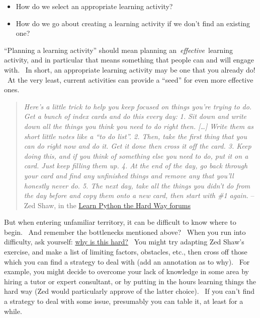 \begin{itemize}
\item
  How do we select an appropriate learning activity?
\item
  How do we go about creating a learning activity if we don't find an
  existing one?
\end{itemize}

``Planning a learning activity'' should mean planning
an~\emph{effective}~learning activity, and in particular that means
something that people can and will engage with. ~In short, an
appropriate learning activity may be one that you already do! ~At the
very least, current activities can provide a ``seed'' for even more
effective ones.

\begin{quote}
\emph{Here's a little trick to help you keep focused on things you're
trying to do. Get a bunch of index cards and do this every day:}
\emph{1. Sit down and write down all the things you think you need to do
right then. {[}\ldots{}{]} Write them as short little notes like a ``to
do list''. 2. Then, take the first thing that you can do right now and
do it. Get it done then cross it off the card. 3. Keep doing this, and
if you think of something else you need to do, put it on a card. Just
keep filling them up. 4. At the end of the day, go back through your
card and find any unfinished things and remove any that you'll honestly
never do. 5. The next day, take all the things you didn't do from the
day before and copy them onto a new card, then start with \#1 again.} --
Zed Shaw, in the
\href{http://learnpythonthehardway.org/book/intro.html\#comment-409972596}{Learn
Python the Hard Way forums}
\end{quote}

But when entering unfamiliar territory, it can be difficult to know
where to begin.~ And remember the bottlenecks mentioned above?~ When you
run into difficulty, ask yourself:
\href{http://peeragogy.org/patterns-and-heuristics/}{why is this hard?}~
You might try adapting Zed Shaw's exercise, and make a list of limiting
factors, obstacles, etc., then cross off those which you can find a
strategy to deal with (add an annotation as to why). ~For example, you
might decide to overcome your lack of knowledge in some area by hiring a
tutor or expert consultant, or by putting in the hours learning things
the hard way (Zed would particularly approve of the latter choice).~ If
you can't find a strategy to deal with some issue, presumably you can
table it, at least for a while.

